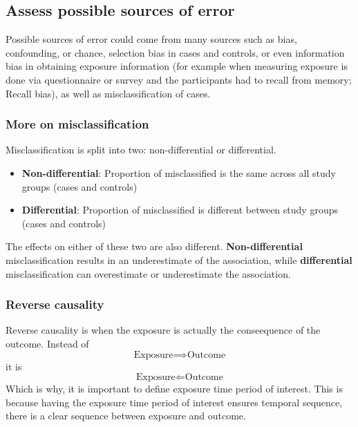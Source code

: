 \documentclass{article}
\begin{document}
\subsection*{Assess possible sources of error}
Possible sources of error could come from many sources such as bias, confounding, or chance, selection bias in cases and controls, or even information bias in obtaining exposure information (for example when measuring exposure is done via questionnaire or survey and the participants had to recall from memory; Recall bias), as well as misclassification of cases.

\subsubsection*{More on misclassification}
Misclassification is split into two: non-differential or differential.
\begin{itemize}
    \item \textbf{Non-differential}: Proportion of misclassified is the same across all study groups (cases and controls)
    \item \textbf{Differential}: Proportion of misclassified is different between study groups (cases and controls)
\end{itemize}
The effects on either of these two are also different. \textbf{Non-differential} misclassification results in an underestimate of the association, while \textbf{differential} misclassification can overestimate or underestimate the association.

\subsubsection*{Reverse causality}
Reverse causality is when the exposure is actually the conseequence of the outcome. Instead of
\begin{equation*}
    \text{Exposure} \implies \text{Outcome}
\end{equation*}
it is
\begin{equation*}
    \text{Exposure} \Longleftarrow \text{Outcome}
\end{equation*}
Which is why, it is important to define exposure time period of interest. This is because having the exposure time period of interest ensures temporal sequence, there is a clear sequence between exposure and outcome.
\end{document}
